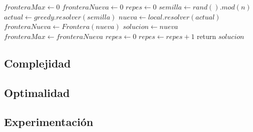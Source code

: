 \begin{algorithm}[H]
\begin{algorithmic}
	\State $fronteraMax \gets 0$
	\State $fronteraNueva \gets 0$
	\State $repes \gets 0$
        \State $semilla \gets rand().mod(n)$
        \State $actual \gets greedy.resolver(semilla)$
    	\State $nueva \gets local.resolver(actual)$
    	\State $fronteraNueva \gets Frontera(nueva)$
    		\State $solucion \gets nueva$
    		\State $fronteraMax \gets fronteraNueva$
            \State $repes \gets 0$
    	\Else 
    		\State $repes \gets repes + 1$
    	\EndIf
    \EndWhile
    \State return $solucion$

\EndFunction
\end{algorithmic}
\end{algorithm}


\subsection{Complejidad}


\subsection{Optimalidad}


\subsection{Experimentación}

